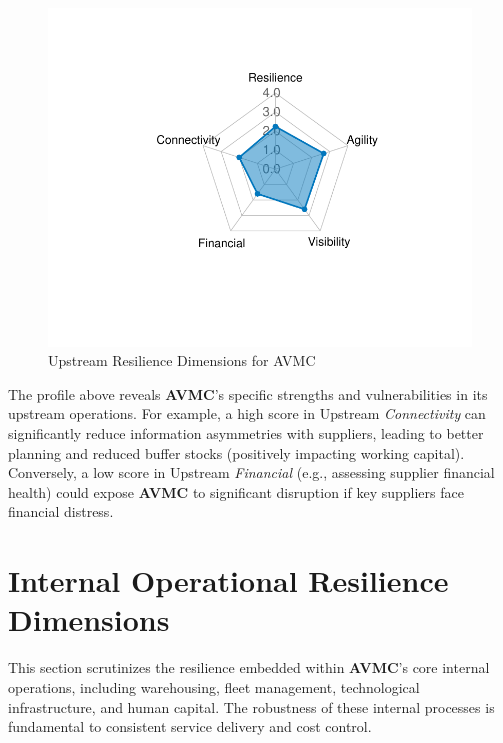 \documentclass[
  oneside,
  open=any,
  fontsize=11pt]{scrbook}
\begin{document}
\begin{figure}[H]

{\centering \includegraphics[width=0.8\linewidth,height=\textheight,keepaspectratio]{example_3_files/figure-pdf/upstream-radar-chart-1.pdf}

}

\caption{Upstream Resilience Dimensions for AVMC}

\end{figure}%

The profile above reveals \textbf{AVMC}'s specific strengths and
vulnerabilities in its upstream operations. For example, a high score in
Upstream \emph{Connectivity} can significantly reduce information
asymmetries with suppliers, leading to better planning and reduced
buffer stocks (positively impacting working capital). Conversely, a low
score in Upstream \emph{Financial} (e.g., assessing supplier financial
health) could expose \textbf{AVMC} to significant disruption if key
suppliers face financial distress.

\section{Internal Operational Resilience
Dimensions}\label{internal-operational-resilience-dimensions}

This section scrutinizes the resilience embedded within \textbf{AVMC}'s
core internal operations, including warehousing, fleet management,
technological infrastructure, and human capital. The robustness of these
internal processes is fundamental to consistent service delivery and
cost control.
\end{document}
